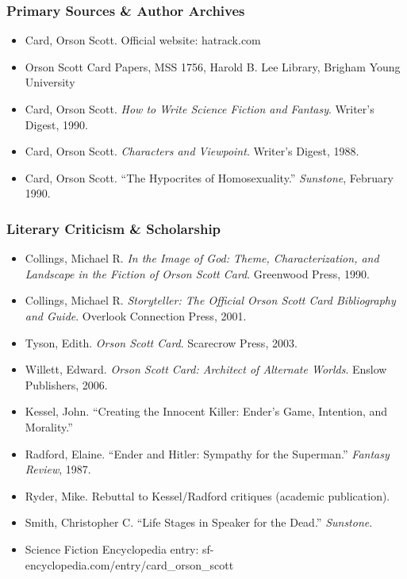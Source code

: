 \documentclass[11pt,letterpaper]{article}
\begin{document}
\subsubsection{Primary Sources \& Author Archives}

\begin{itemize}[leftmargin=2em]
  \item Card, Orson Scott. Official website: hatrack.com
  \item Orson Scott Card Papers, MSS 1756, Harold B. Lee Library, Brigham Young University
  \item Card, Orson Scott. \textit{How to Write Science Fiction and Fantasy}. Writer's Digest, 1990.
  \item Card, Orson Scott. \textit{Characters and Viewpoint}. Writer's Digest, 1988.
  \item Card, Orson Scott. ``The Hypocrites of Homosexuality.'' \textit{Sunstone}, February 1990.
\end{itemize}

\subsubsection{Literary Criticism \& Scholarship}

\begin{itemize}[leftmargin=2em]
  \item Collings, Michael R. \textit{In the Image of God: Theme, Characterization, and Landscape in the Fiction of Orson Scott Card}. Greenwood Press, 1990.
  \item Collings, Michael R. \textit{Storyteller: The Official Orson Scott Card Bibliography and Guide}. Overlook Connection Press, 2001.
  \item Tyson, Edith. \textit{Orson Scott Card}. Scarecrow Press, 2003.
  \item Willett, Edward. \textit{Orson Scott Card: Architect of Alternate Worlds}. Enslow Publishers, 2006.
  \item Kessel, John. ``Creating the Innocent Killer: Ender's Game, Intention, and Morality.''
  \item Radford, Elaine. ``Ender and Hitler: Sympathy for the Superman.'' \textit{Fantasy Review}, 1987.
  \item Ryder, Mike. Rebuttal to Kessel/Radford critiques (academic publication).
  \item Smith, Christopher C. ``Life Stages in Speaker for the Dead.'' \textit{Sunstone}.
  \item Science Fiction Encyclopedia entry: sf-encyclopedia.com/entry/card\_orson\_scott
\end{itemize}
\end{document}

